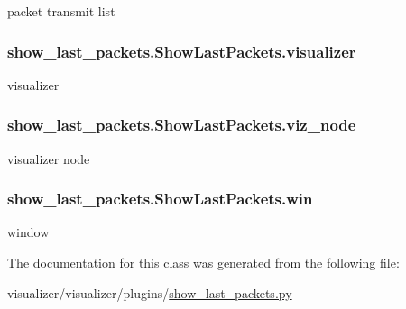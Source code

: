 packet transmit list 

\subsubsection[{\texorpdfstring{visualizer}{visualizer}}]{\setlength{\rightskip}{0pt plus 5cm}show\+\_\+last\+\_\+packets.\+Show\+Last\+Packets.\+visualizer}\hypertarget{classshow__last__packets_1_1ShowLastPackets_aafe3eb5d6509654089b644b42c63f177}{}\label{classshow__last__packets_1_1ShowLastPackets_aafe3eb5d6509654089b644b42c63f177}


visualizer 

\subsubsection[{\texorpdfstring{viz\+\_\+node}{viz_node}}]{\setlength{\rightskip}{0pt plus 5cm}show\+\_\+last\+\_\+packets.\+Show\+Last\+Packets.\+viz\+\_\+node}\hypertarget{classshow__last__packets_1_1ShowLastPackets_a7bef1901e6a888f94e936a21eb53a46b}{}\label{classshow__last__packets_1_1ShowLastPackets_a7bef1901e6a888f94e936a21eb53a46b}


visualizer node 

\subsubsection[{\texorpdfstring{win}{win}}]{\setlength{\rightskip}{0pt plus 5cm}show\+\_\+last\+\_\+packets.\+Show\+Last\+Packets.\+win}\hypertarget{classshow__last__packets_1_1ShowLastPackets_a6a9100fa3cf84db3e07a20e257adb254}{}\label{classshow__last__packets_1_1ShowLastPackets_a6a9100fa3cf84db3e07a20e257adb254}


window 



The documentation for this class was generated from the following file\+:\begin{DoxyCompactItemize}
\item 
visualizer/visualizer/plugins/\hyperlink{show__last__packets_8py}{show\+\_\+last\+\_\+packets.\+py}\end{DoxyCompactItemize}
